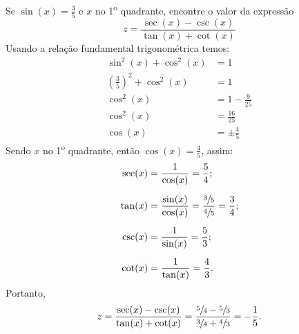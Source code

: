 \begin{example}
  Se \(\sin(x) = \frac{3}{5}\) e $x$ no 1\textsuperscript{o} quadrante,
  encontre o valor da expressão
  \[
    z = \frac{\sec(x)- \csc(x)}{\tan(x)+ \cot(x)}
  \]
  Usando a relação fundamental trigonométrica temos:
  \begin{align*}
    \sin^2(x)+ \cos^2(x)                    & = 1               \\
    \left( \frac{3}{5}\right)^2 + \cos^2(x) & = 1               \\
    \cos^2(x)                               & = 1-\frac{9}{25}  \\
    \cos^2(x)                               & = \frac{16}{25}   \\
    \cos(x)                                 & = \pm \frac{4}{5}
  \end{align*}
  Sendo $x$ no 1\textsuperscript{o} quadrante, então
  \(\cos(x)= \frac{4}{5}\), assim:
  \begin{align*}
    \sec(x) & = \frac{1}{\cos(x)}       = \frac{5}{4};                                     \\[2mm]
    \tan(x) & = \frac{\sin(x)}{\cos(x)} = \frac{\sfrac{3}{5}}{\sfrac{4}{5}} = \frac{3}{4}; \\[2mm]
    \csc(x) & = \frac{1}{\sin(x)}       = \frac{5}{3};                                     \\[2mm]
    \cot(x) & = \frac{1}{\tan(x)}       = \frac{4}{3}.
  \end{align*}
  Portanto,
  \[
    z
    = \frac{\sec(x) - \csc(x)}{\tan(x) + \cot(x)}
    = \frac{\sfrac{5}{4} - \sfrac{5}{3}}{\sfrac{3}{4} + \sfrac{4}{3}}
    = -\frac{1}{5}.
  \]
\end{example}
